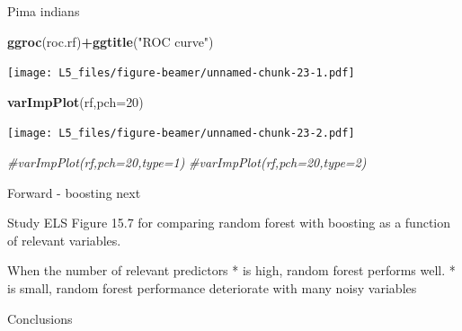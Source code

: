 \documentclass[
  ignorenonframetext,
]{beamer}
\newenvironment{Shaded}{\begin{snugshade}}{\end{snugshade}}
\newcommand{\CommentTok}[1]{\textcolor[rgb]{0.56,0.35,0.01}{\textit{#1}}}
\newcommand{\DataTypeTok}[1]{\textcolor[rgb]{0.13,0.29,0.53}{#1}}
\newcommand{\DecValTok}[1]{\textcolor[rgb]{0.00,0.00,0.81}{#1}}
\newcommand{\KeywordTok}[1]{\textcolor[rgb]{0.13,0.29,0.53}{\textbf{#1}}}
\newcommand{\NormalTok}[1]{#1}
\newcommand{\OperatorTok}[1]{\textcolor[rgb]{0.81,0.36,0.00}{\textbf{#1}}}
\newcommand{\StringTok}[1]{\textcolor[rgb]{0.31,0.60,0.02}{#1}}
\begin{document}
\begin{frame}[fragile]
\begin{block}{Pima indians}
\begin{Shaded}
\begin{Highlighting}[]
\KeywordTok{ggroc}\NormalTok{(roc.rf)}\OperatorTok{+}\KeywordTok{ggtitle}\NormalTok{(}\StringTok{"ROC curve"}\NormalTok{)}
\end{Highlighting}
\end{Shaded}

\texttt{[image: L5\_files/figure-beamer/unnamed-chunk-23-1.pdf]}

\begin{Shaded}
\begin{Highlighting}[]
\KeywordTok{varImpPlot}\NormalTok{(rf,}\DataTypeTok{pch=}\DecValTok{20}\NormalTok{)}
\end{Highlighting}
\end{Shaded}

\texttt{[image: L5\_files/figure-beamer/unnamed-chunk-23-2.pdf]}

\begin{Shaded}
\begin{Highlighting}[]
\CommentTok{#varImpPlot(rf,pch=20,type=1)}
\CommentTok{#varImpPlot(rf,pch=20,type=2)}
\end{Highlighting}
\end{Shaded}

\end{block}

\begin{block}{Forward - boosting next}

Study ELS Figure 15.7 for comparing random forest with boosting as a
function of relevant variables.

When the number of relevant predictors * is high, random forest performs
well. * is small, random forest performance deteriorate with many noisy
variables

\end{block}

\end{frame}

\begin{frame}{Conclusions}
\protect\hypertarget{conclusions}{}

\end{frame}
\end{document}
